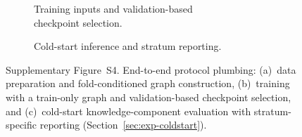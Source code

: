 \documentclass[preprint,11pt]{elsarticle}
\begin{document}
\begin{figure}[!t]
\begin{subfigure}[t]{0.36\linewidth}
\begin{tikzpicture}
\end{tikzpicture}
\caption{Training inputs and validation-based\\
checkpoint selection.}
\label{fig:pipe-train}
\end{subfigure}\hfill
\begin{subfigure}[t]{0.28\linewidth}
\centering
{}
\caption{Cold-start inference and stratum reporting.}
\label{fig:pipe-infer}
\end{subfigure}
\caption{Supplementary Figure~S4. End-to-end protocol plumbing: (a)~data
preparation and fold-conditioned graph construction, (b)~training with a
train-only graph and validation-based checkpoint selection, and
(c)~cold-start knowledge-component evaluation with \mbox{stratum-specific}
reporting (Section~\ref{sec:exp-coldstart}).}
\label{fig:pipelines}
\end{figure}
\end{document}
